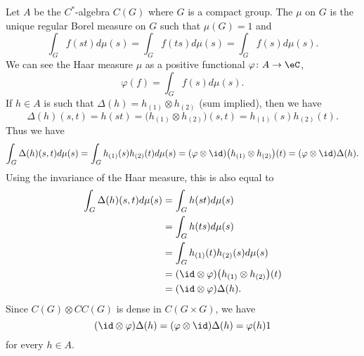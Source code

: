 Let $A$ be the $C^*$-algebra $C(G)$ where $G$ is a compact group. The  $\mu$ on $G$ is the unique regular Borel measure on $G$ such that $\mu(G)=1$ and
\begin{equation}
	\int_G f(st)d\mu(s)=\int_G f(ts)d\mu(s)=\int_Gf(s)d\mu(s).
\end{equation}
We can see the Haar measure $\mu$ as a positive functional $\varphi\colon A\to \eC$,
\begin{equation}
	\varphi(f)=\int_G f(s)d\mu(s).
\end{equation}
If $h\in A$ is such that $\Delta(h)=h_{(1)}\otimes h_{(2)}$ (sum implied), then we have
\begin{equation}
	\Delta(h)(s,t)=h(st)=\big( h_{(1)}\otimes h_{(2)} \big)(s,t)=h_{(1)}(s)h_{(2)}(t).
\end{equation}
Thus we have
\begin{equation}
	\int_G\Delta(h)(s,t)d\mu(s)=\int_Gh_{(1)}(s)h_{(2)}(t)d\mu(s)=(\varphi\otimes\id)\big( h_{(1)}\otimes h_{(2)} \big)(t)=(\varphi\otimes\id)\Delta(h).
\end{equation}
Using the invariance of the Haar measure, this is also equal to
\begin{equation}
	\begin{aligned}[]
		\int_G\Delta(h)(s,t)d\mu(s) & =\int_Gh(st)d\mu(s)                                       \\
		                            & =\int_Gh(ts)d\mu(s)                                       \\
		                            & =\int_Gh_{(1)}(t)h_{(2)}(s)d\mu(s)                        \\
		                            & =(\id\otimes\varphi)\big( h_{(1)}\otimes h_{(2)} \big)(t) \\
		                            & =(\id\otimes\varphi)\Delta(h).
	\end{aligned}
\end{equation}
Since $C(G)\otimes CC(G)$ is dense in $C(G\times G)$, we have
\begin{equation}
	(\id\otimes\varphi)\Delta(h)=(\varphi\otimes\id)\Delta(h)=\varphi(h)1
\end{equation}
for every $h\in A$.

